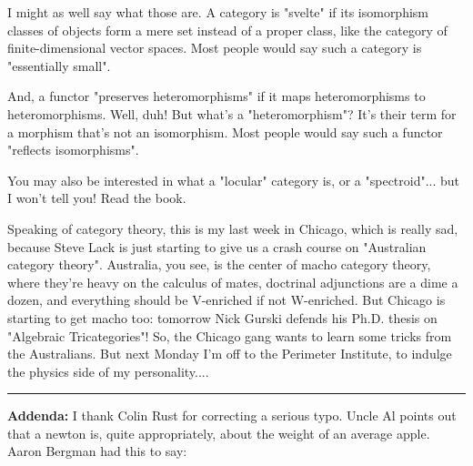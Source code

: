 I might as well say what those are.  A category is "svelte"
if its isomorphism classes of objects form a mere set instead of a
proper class, like the category of finite-dimensional vector spaces.
Most people would say such a category is "essentially
small".

And, a functor "preserves heteromorphisms" if it maps
heteromorphisms to heteromorphisms.  Well, duh!  But what's a
"heteromorphism"?  It's their term for a morphism that's not
an isomorphism.  Most people would say such a functor "reflects
isomorphisms".

You may also be interested in what a "locular" category is,
or a "spectroid"... but I won't tell you!  Read the book.

Speaking of category theory, this is my last week in Chicago, which
is really sad, because Steve Lack is just starting to give us a
crash course on "Australian category theory".  Australia, 
you see, is the center of macho category theory, where 
they're heavy on the calculus of mates,
doctrinal adjunctions are a dime a dozen, and everything should be
V-enriched if not W-enriched.  But
Chicago is starting to get macho too: tomorrow Nick Gurski defends
his Ph.D. thesis on "Algebraic Tricategories"!    So, the Chicago
gang wants to learn some tricks from the Australians.  But next
Monday I'm off to the Perimeter Institute, to indulge the physics
side of my personality....

\par\noindent\rule{\textwidth}{0.4pt}
\textbf{Addenda:} 
I thank Colin Rust for correcting a serious typo.  Uncle Al
points out that a newton is, quite appropriately, about the weight 
of an average apple.  Aaron Bergman had this to say:


